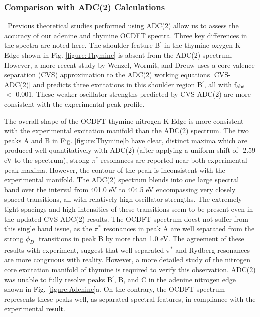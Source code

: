 \documentclass[12pt]{article}
\begin{document}
\subsubsection{Comparison with ADC(2) Calculations} \
Previous theoretical studies performed using ADC(2) allow us to assess the accuracy of our adenine and thymine OCDFT spectra. Three key differences in the spectra are noted here. 
The shoulder feature B$^{\prime}$ in the thymine oxygen K-Edge shown in Fig. \ref{figure:Thymine} is absent from the ADC(2) spectrum.\cite{plekan_theoretical_2008} However, a more recent study by Wenzel, Wormit, and Dreuw \cite{wenzel_calculating_2014} uses a core-valence separation (CVS) approximation to the ADC(2) working equations [CVS-ADC(2)] and predicts three excitations in this shoulder region B$^{\prime}$, all with f$_{\rm abs}$ $<$ 0.001. These weaker oscillator strengths predicted by CVS-ADC(2) are more consistent with the experimental peak profile.

The overall shape of the OCDFT thymine nitrogen K-Edge is more consistent with the experimental excitation manifold than the ADC(2) spectrum. The two peaks A and B in Fig. \ref{figure:Thymine}b have clear, distinct maxima which are produced well quantitatively with ADC(2) (after applying a uniform shift of -2.59 eV to the spectrum), strong $\pi^*$ resonances are reported near both experimental peak maxima. However, the contour of the peak is inconsistent with the experimental manifold. The ADC(2) spectrum blends into one large spectral band over the interval from 401.0 eV to 404.5 eV encompassing very closely spaced transitions, all with relatively high oscillator strengths. The extremely tight spacings and high intensities of these transitions seem to be present even in the updated CVS-ADC(2) results. The OCDFT spectrum doest not suffer from this single band issue, as the $\pi^*$ resonances in peak A are well separated from the strong $\phi_{D_1}$ transitions in peak B by more than 1.0 eV. The agreement of these results with experiment, suggest that well-separated $\pi^*$ and Rydberg resonances are more congruous with reality. However, a more detailed study of the nitrogen core excitation manifold of thymine is required to verify this observation.
ADC(2) was unable to fully resolve peaks B$^{\prime}$, B, and C in the adenine nitrogen edge shown in Fig. \ref{figure:Adenine}a. On the contrary, the OCDFT spectrum represents these peaks well, as separated spectral features, in compliance with the experimental result. 
\end{document}
